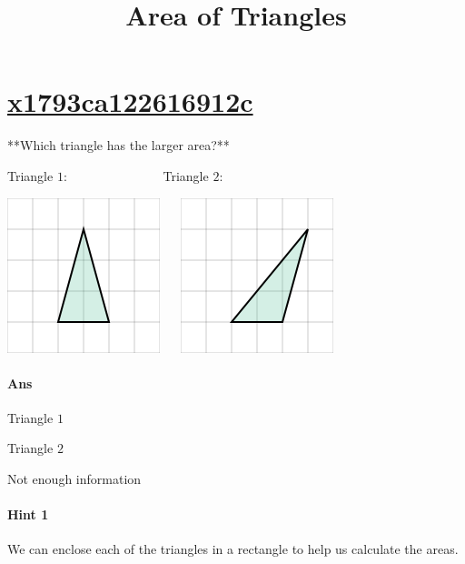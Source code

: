 \documentclass[twocolumn,10pt]{article}
\title{Area of Triangles}
\def\shrinkfactor{0.55}
\begin{document}
\maketitle



\section{\href{https://www.khanacademy.org/devadmin/content/items/x1793ca122616912c}{x1793ca122616912c}}

\noindent
**Which triangle has the larger area?**  

Triangle $1$:  $\qquad\qquad \qquad ~~~~$ Triangle $2$:  

\includegraphics[scale=\shrinkfactor]{figures/de446b509a40b3e231b7217d8602d7e3d1ef4c90.png} $\quad$ 
\includegraphics[scale=\shrinkfactor]{figures/dc0e8470e25253d17fd6faaff4da3897941fe7e9.png}

\paragraph{Ans} 

Triangle $1$

Triangle $2$


 Not enough information



\paragraph{Hint 1}We can enclose each of the triangles in a rectangle to help us calculate the areas.  
\end{document}
